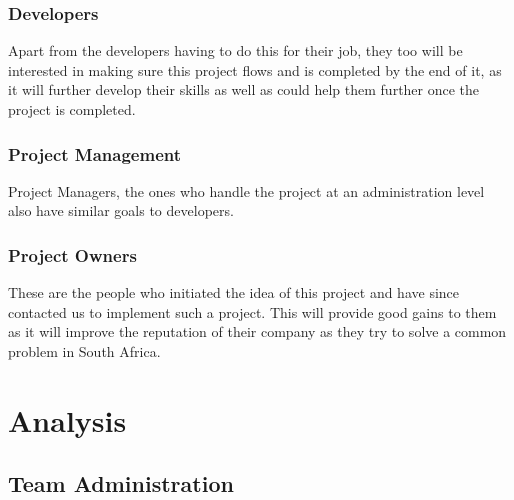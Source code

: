 \documentclass[a4paper,12pt]{article}
\begin{document}
\subsubsection{Developers}
Apart from the developers having to do this for their job, they too will be interested in making sure this project flows and is completed by the end of it, as it will further develop their skills as well as could help them further once the project is completed. 
\subsubsection{Project Management}
Project Managers, the ones who handle the project at an administration level also have similar goals to developers.
\subsubsection{Project Owners}
These are the people who initiated the idea of this project and have since contacted us to implement such a project. This will provide good gains to them as it will improve the reputation of their company as they try to solve a common problem in South Africa.

\pagebreak
\section{Analysis}
\subsection{Team Administration}
\end{document}
